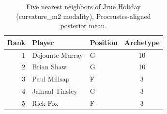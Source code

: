 \begin{table}[htbp]
  \centering\small
  \begin{tabular}{rllc}
    \toprule
    Rank & Player & Position & Archetype \\
    \midrule
    1 & Dejounte Murray & G & 10 \\
    2 & Brian Shaw & G & 10 \\
    3 & Paul Millsap & F & 3 \\
    4 & Jamaal Tinsley & G & 3 \\
    5 & Rick Fox & F & 3 \\
    \bottomrule
  \end{tabular}
  \caption{Five nearest neighbors of Jrue Holiday (curvature_m2 modality), Procrustes-aligned posterior mean.}
  \label{tab:Jrue_Holiday_neighbors_curvature_m2}
\end{table}

